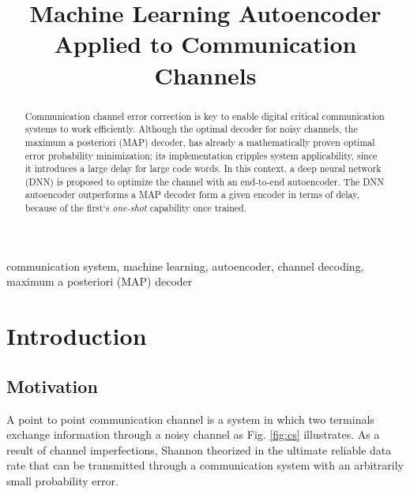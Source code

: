 \documentclass[conference]{IEEEtran}
\begin{document}
\title{Machine Learning Autoencoder Applied to Communication Channels}


\author{
}



\maketitle

\begin{abstract}

Communication channel error correction is key to enable digital critical communication systems to work efficiently. Although the optimal decoder for noisy channels, the maximum a posteriori (MAP) decoder, has already a mathematically proven optimal error probability minimization; its implementation cripples system applicability, since it introduces a large delay for large code words. In this context, a deep neural network (DNN) is proposed to optimize the channel with an end-to-end autoencoder. The DNN autoencoder outperforms a MAP decoder form a given encoder in terms of delay, because of the first`s \textit{one-shot} capability once trained.

\end{abstract}

\begin{IEEEkeywords}
communication system, machine learning,  autoencoder, channel decoding, maximum a posteriori (MAP) decoder 
\end{IEEEkeywords}

\section{Introduction}
\subsection{Motivation}
A point to point communication channel is a system in which  two terminals exchange information through a noisy channel as Fig. \ref{fig:cs} illustrates. As a result of channel imperfections, Shannon theorized in \cite{b1} the ultimate reliable data rate that can be transmitted through a communication system with an arbitrarily small probability error. 
\end{document}
